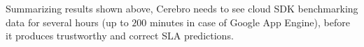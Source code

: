 Summarizing results shown above, 
Cerebro needs to see cloud SDK benchmarking data 
for several hours (up to $200$ minutes in case of 
Google App Engine), before it produces trustworthy and correct 
SLA predictions. 

